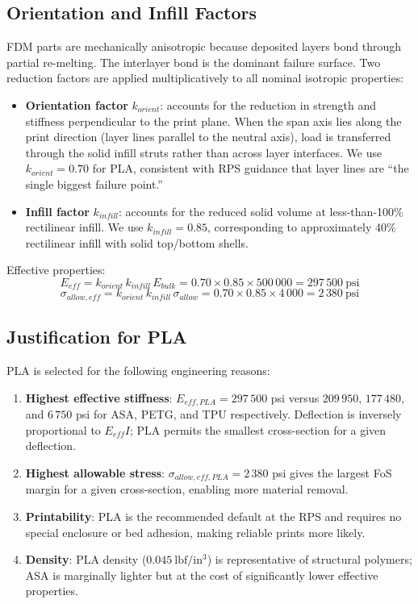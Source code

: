 \documentclass[11pt,letterpaper]{article}
\begin{document}
\subsection{Orientation and Infill Factors}

FDM parts are mechanically anisotropic because deposited layers bond through
partial re-melting.  The interlayer bond is the dominant failure surface.
Two reduction factors are applied multiplicatively to all nominal isotropic
properties:

\begin{itemize}[noitemsep]
  \item \textbf{Orientation factor} $k_{orient}$: accounts for the reduction
    in strength and stiffness perpendicular to the print plane.  When the span
    axis lies along the print direction (layer lines parallel to the neutral
    axis), load is transferred through the solid infill struts rather than
    across layer interfaces.  We use $k_{orient} = 0.70$ for PLA, consistent
    with RPS guidance that layer lines are ``the single biggest failure point.''
  \item \textbf{Infill factor} $k_{infill}$: accounts for the reduced
    solid volume at less-than-100\% rectilinear infill.  We use
    $k_{infill} = 0.85$, corresponding to approximately 40\% rectilinear
    infill with solid top/bottom shells.
\end{itemize}

Effective properties:
\[
  E_{eff} = k_{orient}\,k_{infill}\,E_{bulk}
  = 0.70 \times 0.85 \times 500\,000 = 297\,500\ \mathrm{psi}
\]
\[
  \sigma_{allow,eff} = k_{orient}\,k_{infill}\,\sigma_{allow}
  = 0.70 \times 0.85 \times 4\,000 = 2\,380\ \mathrm{psi}
\]

\subsection{Justification for PLA}

PLA is selected for the following engineering reasons:

\begin{enumerate}[noitemsep]
  \item \textbf{Highest effective stiffness}: $E_{eff,PLA} = 297\,500$ psi
    versus $209\,950$, $177\,480$, and $6\,750$ psi for ASA, PETG, and TPU
    respectively.  Deflection is inversely proportional to $E_{eff}I$;
    PLA permits the smallest cross-section for a given deflection.
  \item \textbf{Highest allowable stress}: $\sigma_{allow,eff,PLA} = 2\,380$
    psi gives the largest FoS margin for a given cross-section, enabling
    more material removal.
  \item \textbf{Printability}: PLA is the recommended default at the RPS and
    requires no special enclosure or bed adhesion, making reliable prints
    more likely.
  \item \textbf{Density}: PLA density ($0.045\ \mathrm{lbf/in^3}$) is
    representative of structural polymers; ASA is marginally lighter but
    at the cost of significantly lower effective properties.
\end{enumerate}
\end{document}
